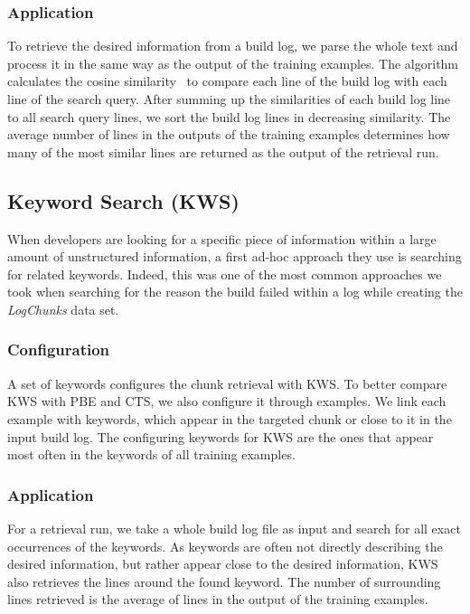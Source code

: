 \subsubsection{Application}
To retrieve the desired information from a build log, we parse the whole text and process it in the same way as the output of the training examples.
The algorithm calculates the cosine similarity~\cite{korenius2007principal} to compare each line of the build log with each line of the search query.
After summing up the similarities of each build log line to all search query lines, we sort the build log lines in decreasing similarity.
The average number of lines in the outputs of the training examples determines how many of the most similar lines are returned as the output of the retrieval run.

\subsection{Keyword Search (KWS)}
\label{sec:expl-skws}
When developers are looking for a specific piece of information within a large amount of unstructured information, a first ad-hoc approach they use is searching for related keywords.
Indeed, this was one of the most common approaches we took when searching for the reason the build failed within a log while creating the \emph{LogChunks} data set.

\subsubsection{Configuration}
A set of keywords configures the chunk retrieval with KWS\@.
To better compare KWS with PBE and CTS, we also configure it through examples.
We link each example with keywords, which appear in the targeted chunk or close to it in the input build log.
The configuring keywords for KWS are the ones that appear most often in the keywords of all training examples.

\subsubsection{Application}
For a retrieval run, we take a whole build log file as input and search for all exact occurrences of the keywords.
As keywords are often not directly describing the desired information, but rather appear close to the desired information, KWS also retrieves the lines around the found keyword.
The number of surrounding lines retrieved is the average of lines in the output of the training examples.

